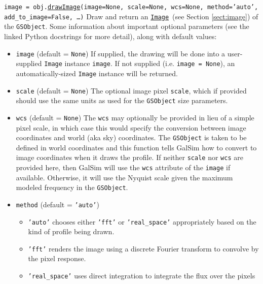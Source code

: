 \documentclass[preprint,10pt]{../../devel/modules/aastex}
\newcommand\drawImage{\href{http://galsim-developers.github.io/GalSim/classgalsim_1_1base_1_1_g_s_object.html\#aafe6ca9d84fe81543fbc105b897273db}{\texttt{drawImage}}}
\newcommand\Image{\href{http://galsim-developers.github.io/GalSim/classgalsim_1_1image_1_1_image.html}{\texttt{Image}}}
\begin{document}
\begin{itemize}
  \texttt{image = obj.}\drawImage\texttt{(image=None, scale=None, wcs=None, method='auto', \\
  \phantom{image = obj.drawImage(}add\_to\_image=False, \dots)}
    \newline 
    Draw and return an \Image\ (see Section \ref{sect:image}) of the \texttt{GSObject}.
    Some information about important optional parameters (see the
    linked Python docstrings for more detail), along with default values:
    \begin{itemize}
    \item \texttt{image} (default = \texttt{None}) \newline
      If supplied, the drawing will be done into a user-supplied
      \texttt{Image} instance \texttt{image}.  If not supplied
      (i.e. \texttt{image = None}), an
      automatically-sized \texttt{Image} instance will be returned.
    \item \texttt{scale} (default = \texttt{None}) \newline
      The optional image pixel \texttt{scale}, which if provided
      should use the same units as used for the \texttt{GSObject} size
      parameters.
    \item \texttt{wcs} (default = \texttt{None}) \newline
      The \texttt{wcs} may optionally be provided in lieu of a simple pixel scale,
      in which case this would specify the conversion between image
      coordinates and world (aka sky) coordinates.  The \texttt{GSObject}
      is taken to be defined in world coordinates and this function tells
      GalSim how to convert to image coordinates when it draws the profile.
      If neither \texttt{scale} nor \texttt{wcs} are provided here, then GalSim will
      use the \texttt{wcs} attribute of the \texttt{image} if available.
      Otherwise, it will use the Nyquist scale given the
      maximum modeled frequency in the \texttt{GSObject}.
    \item \texttt{method} (default = \texttt{'auto'})
      \begin{itemize}
        \item \texttt{'auto'} chooses either \texttt{'fft'} or \texttt{'real\_space'}
          appropriately based on the kind of profile being drawn.
        \item \texttt{'fft'} renders the image using a discrete Fourier transform to convolve by the
          pixel response.
        \item \texttt{'real\_space'} uses direct integration to integrate the flux over the pixels

\end{itemize}
\end{itemize}
\end{itemize}
\end{document}
